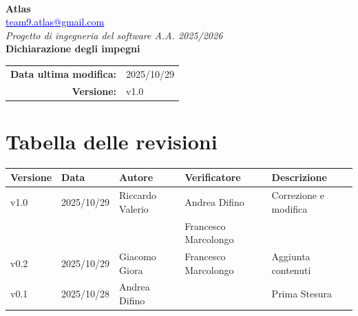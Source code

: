 \documentclass[a4paper,12pt]{article}
\makeatletter
\newcommand{\Gruppo}{Atlas}
\newcommand{\Email}{\href{mailto:team9.atlas@gmail.com}{\textcolor{blue}{\underline{team9.atlas@gmail.com}}}}
\newcommand{\TitoloUno}{Dichiarazione degli impegni}
\newcommand{\DataModifica}{2025/10/29}
\newcommand{\LogoGruppo}{img/AtlasLogo.png} %
\newcommand{\VersioneDocumento}{v1.0} %
\makeatother
\begin{document}
\begin{titlepage}
    \centering

    \vspace*{0cm}
    \\[0.8cm]

    {\LARGE \textbf{\Gruppo}}\\[0.1cm]
    {\large \Email}\\[1.2cm]

    {\Large \textit{Progetto di ingegneria del software A.A. 2025/2026}}\\[1.5cm]

    {\Huge \textbf{\TitoloUno}}\\[.5cm]

    \begin{tabular}{rl}
        \textbf{Data ultima modifica:} & \DataModifica \\
        \textbf{Versione:} & \VersioneDocumento \\
    \end{tabular}

\end{titlepage}


\section*{Tabella delle revisioni}
    \begin{center} 
        \begin{tabular}{|l|l|l|l|l|}
            \hline
            \textbf{Versione} & \textbf{Data} & \textbf{Autore} & \textbf{Verificatore} & \textbf{Descrizione} \\
            \hline
            v1.0 & 2025/10/29 & Riccardo Valerio & Andrea Difino & Correzione e modifica\\
            &&& Francesco Marcolongo & \\
            \hline 
            v0.2 & 2025/10/29 & Giacomo Giora & Francesco Marcolongo & Aggiunta contenuti \\
            \hline
            v0.1 & 2025/10/28 & Andrea Difino & & Prima Stesura \\
            \hline
        \end{tabular}
    \end{center}
\end{document}
